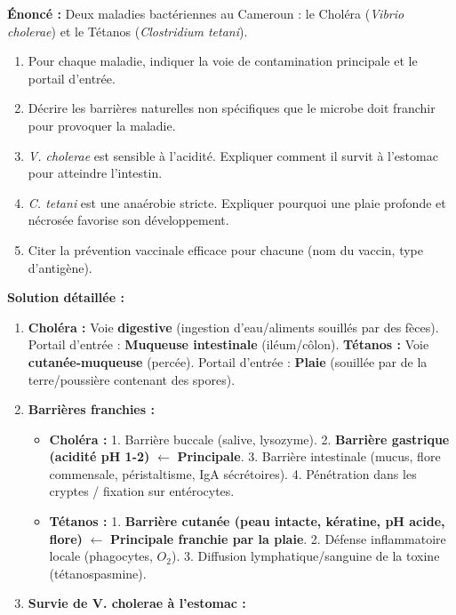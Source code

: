 \documentclass[11pt]{article}
\begin{document}
\begin{exoresolu}
    \textbf{Énoncé :} Deux maladies bactériennes au Cameroun : le Choléra (\emph{Vibrio cholerae}) et le Tétanos (\emph{Clostridium tetani}).
    \begin{enumerate}
        \item Pour chaque maladie, indiquer la voie de contamination principale et le portail d'entrée.
        \item Décrire les barrières naturelles non spécifiques que le microbe doit franchir pour provoquer la maladie.
        \item \emph{V. cholerae} est sensible à l'acidité. Expliquer comment il survit à l'estomac pour atteindre l'intestin.
        \item \emph{C. tetani} est une anaérobie stricte. Expliquer pourquoi une plaie profonde et nécrosée favorise son développement.
        \item Citer la prévention vaccinale efficace pour chacune (nom du vaccin, type d'antigène).
    \end{enumerate}
    \tcblower
    \textbf{Solution détaillée :}
    \begin{enumerate}
        \item \textbf{Choléra :} Voie \textbf{digestive} (ingestion d'eau/aliments souillés par des fèces). Portail d'entrée : \textbf{Muqueuse intestinale} (iléum/côlon).
              \textbf{Tétanos :} Voie \textbf{cutanée-muqueuse} (percée). Portail d'entrée : \textbf{Plaie} (souillée par de la terre/poussière contenant des spores).
        \item \textbf{Barrières franchies :}
              \begin{itemize}
                  \item \textbf{Choléra :} 1. Barrière buccale (salive, lysozyme). 2. \textbf{Barrière gastrique (acidité pH 1-2)} $\leftarrow$ \textbf{Principale}. 3. Barrière intestinale (mucus, flore commensale, péristaltisme, IgA sécrétoires). 4. Pénétration dans les cryptes / fixation sur entérocytes.
                  \item \textbf{Tétanos :} 1. \textbf{Barrière cutanée (peau intacte, kératine, pH acide, flore)} $\leftarrow$ \textbf{Principale franchie par la plaie}. 2. Défense inflammatoire locale (phagocytes, $O_2$). 3. Diffusion lymphatique/sanguine de la toxine (tétanospasmine).
              \end{itemize}
        \item \textbf{Survie de V. cholerae à l'estomac :}

\end{enumerate}
\end{exoresolu}
\end{document}
